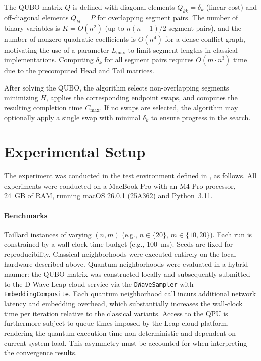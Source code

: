\documentclass[10pt,twoside,twocolumn,a4paper]{article}
\begin{document}
The QUBO matrix $Q$ is defined with diagonal elements $Q_{kk} = \delta_k$ (linear cost) and off-diagonal elements $Q_{kl} = P$ for overlapping segment pairs. The number of binary variables is $K = O(n^2)$ (up to $n(n-1)/2$ segment pairs), and the number of nonzero quadratic coefficients is $O(n^4)$ for a dense conflict graph, motivating the use of a parameter $L_{\max}$ to limit segment lengths in classical implementations. Computing $\delta_k$ for all segment pairs requires $O(m \cdot n^3)$ time due to the precomputed Head and Tail matrices.

After solving the QUBO, the algorithm selects non-overlapping segments minimizing $H$, applies the corresponding endpoint swaps, and computes the resulting completion time $C_{\max}$. If no swaps are selected, the algorithm may optionally apply a single swap with minimal $\delta_k$ to ensure progress in the search.


\section{Experimental Setup}
The experiment was conducted in the test environment defined in
\cite{WojewodzkiBozejko2026}, as follows. All experiments were conducted on
a MacBook Pro with an M4 Pro processor, 24~GB of RAM, running macOS 26.0.1
(25A362) and Python~3.11.

\paragraph{Benchmarks}
Taillard instances \cite{ref_taillard} of varying $(n,m)$ (e.g.,
$n\in\{20\}$, $m\in\{10,20\}$). Each run is constrained by a wall-clock
time budget (e.g., 100~ms). Seeds are fixed for reproducibility.
Classical neighborhoods were executed entirely on the local hardware
described above. Quantum neighborhoods were evaluated in a hybrid manner:
the QUBO matrix was constructed locally and subsequently submitted to the
D-Wave Leap cloud service via the \texttt{DWaveSampler} with
\texttt{EmbeddingComposite}. Each quantum neighborhood call incurs
additional network latency and embedding overhead, which substantially
increases the wall-clock time per iteration relative to the classical
variants. Access to the QPU is furthermore subject to queue times imposed
by the Leap cloud platform, rendering the quantum execution time
non-deterministic and dependent on current system load. This asymmetry
must be accounted for when interpreting the convergence results.
\end{document}

